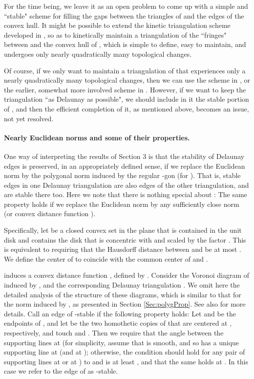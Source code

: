 \documentclass[letter,11pt]{article}
\begin{document}
For the time being, we leave it as an open problem to come up with a 
simple and ``stable" scheme for filling the gaps between the triangles 
of  and the edges of the convex hull. 
It might be possible to extend the kinetic triangulation scheme 
developed in \cite{KRS}, so as to kinetically maintain a triangulation of the
``fringes" between  and the convex hull of , which is simple to define, easy to maintain, and undergoes only nearly quadratically many topological changes.

Of course, if we only want to maintain a triangulation of  that experiences only a nearly quadratically many topological changes, then we can use the scheme in \cite{KRS}, or the earlier, somewhat more involved scheme in \cite{AWY}. However, if we want to keep the triangulation ``as Delaunay as possible", we should include in it the stable portion of , and then the efficient completion of it, as mentioned above, becomes an issue, not yet resolved.

\paragraph{Nearly Euclidean norms and some of their properties.}
One way of interpreting the results of Section 3 is that the stability of Delaunay edges is preserved, in an appropriately defined sense, if we replace the Euclidean norm by the polygonal norm induced by the regular -gon  (for ). That is, stable edges in one Delaunay triangulation are also edges of the other triangulation, and are stable there too. Here we note that there is nothing special about : The same property holds if we replace the Euclidean norm by any sufficiently close norm (or convex distance function \cite{CD}).

Specifically, let  be a closed convex set in the plane that is contained in the
unit disk  and contains the disk  that
is concentric with  and scaled by the factor .
This
is equivalent to requiring that the Hausdorff distance  
between  and  be at most . 
We define the center of  to coincide with the common center of 
 and .




 induces a convex distance function , defined by . Consider the Voronoi diagram 
of  induced by , and the corresponding Delaunay triangulation . We omit here the detailed analysis of the structure of these diagrams, which is similar to that for the norm induced by , as presented in Section \ref{Sec:polygProp}. See also \cite{Chew,CD} for more details. Call an edge  of  -stable if the following property holds: Let  and  be the endpoints of , and let  be the two homothetic copies of  that are centered at , respectively, and touch  and . Then we require that the angle between the 
supporting lines at 
(for simplicity, assume that  is smooth, and so has a unique supporting line at  (and at ); otherwise, the condition should hold for any pair of supporting lines at  or at ) 
to  and  is at least , and that the same holds at .
In this case we refer to the edge  of  as -stable.
\end{document}
